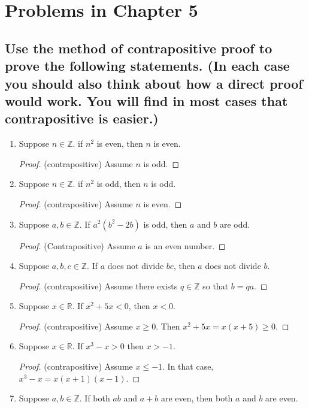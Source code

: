 \documentclass[11pt, oneside]{amsart}
\author{Francisco J. Blanco-Silva}
\date{\today}
\title{}
\begin{document}
\section{Problems in Chapter 5}
\label{sec:orge81f431}
\subsection{Use the method of contrapositive proof to prove the following statements.  (In each case you should also think about how a direct proof would work.  You will find in most cases that contrapositive is easier.)}
\label{sec:orgf0ff73a}
\begin{enumerate}
\item Suppose \(n \in \mathbb{Z}\).  if \(n^2\) is even, then \(n\) is even.
\label{sec:orgbfde277}
\begin{proof} (contrapositive) Assume $n$ is odd. \end{proof}
\item Suppose \(n \in \mathbb{Z}\).  if \(n^2\) is odd, then \(n\) is odd.
\label{sec:org8305869}
\begin{proof} (contrapositive)  Assume $n$ is even. \end{proof}
\item Suppose \(a, b \in \mathbb{Z}\).  If \(a^2(b^2-2b)\) is odd, then \(a\) and \(b\) are odd.
\label{sec:orgfd6e89c}
\begin{proof} (Contrapositive) Assume $a$ is an even number. \end{proof} 
\item Suppose \(a, b, c \in \mathbb{Z}\).  If \(a\) does not divide \(bc\), then \(a\) does not divide \(b\).
\label{sec:org8c2e6a6}
\begin{proof} (contrapositive) Assume there exists $q \in \mathbb{Z}$ so that $b=qa$. \end{proof}
\item Suppose \(x \in \mathbb{R}\).  If \(x^2+5x<0\), then \(x < 0\).
\label{sec:org50e404d}
\begin{proof} (contrapositive) Assume $x \geq 0$.  Then $x^2+5x = x(x+5) \geq 0$. \end{proof}
\item Suppose \(x \in \mathbb{R}\).  If \(x^3-x>0\) then \(x > -1\).
\label{sec:org1885ee7}
\begin{proof} (contrapositive) Assume $x \leq -1$.  In that case, $x^3-x =x(x+1)(x-1).$ \end{proof}
\item Suppose \(a,b \in \mathbb{Z}\).  If both \(ab\) and \(a+b\) are even, then both \(a\) and \(b\) are even.

\end{enumerate}
\end{document}
